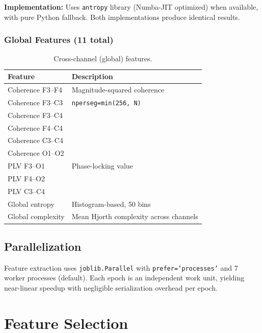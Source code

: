 \textbf{Implementation:} Uses \texttt{antropy} library (Numba-JIT optimized) when available, with pure Python fallback. Both implementations produce identical results.

\subsubsection{Global Features (11 total)}

\begin{table}[h]
\centering
\caption{Cross-channel (global) features.}
\label{tab:global_features}
\begin{tabular}{l l}
\toprule
\textbf{Feature} & \textbf{Description} \\
\midrule
Coherence F3--F4     & Magnitude-squared coherence \\
Coherence F3--C3     & \texttt{nperseg=min(256, N)} \\
Coherence F3--C4     & \\
Coherence F4--C4     & \\
Coherence C3--C4     & \\
Coherence O1--O2     & \\
PLV F3--O1           & Phase-locking value \\
PLV F4--O2           & \\
PLV C3--C4           & \\
Global entropy       & Histogram-based, 50 bins \\
Global complexity    & Mean Hjorth complexity across channels \\
\bottomrule
\end{tabular}
\end{table}

\subsection{Parallelization}

Feature extraction uses \texttt{joblib.Parallel} with \texttt{prefer='processes'} and 7 worker processes (default). Each epoch is an independent work unit, yielding near-linear speedup with negligible serialization overhead per epoch.

\section{Feature Selection}
\label{sec:app_feature_selection}

